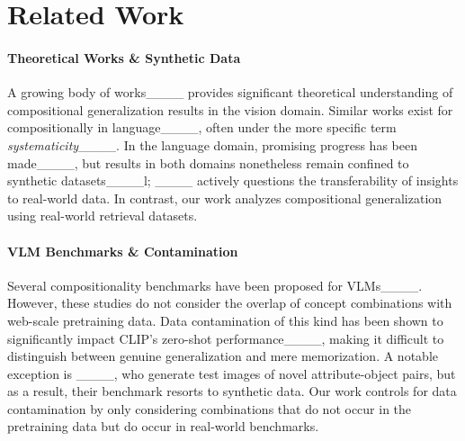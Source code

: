 \section{Related Work}
\label{sec:related}

\paragraph{Theoretical Works \& Synthetic Data}
A growing body of works____ provides significant theoretical understanding of compositional generalization results in the vision domain.
Similar works exist for compositionally in language____, often under the more specific term \emph{systematicity}____.
In the language domain, promising progress has been made____, but results in both domains nonetheless remain confined to synthetic datasets____l; ____ actively questions the transferability of insights to real-world data. In contrast, our work analyzes compositional generalization using real-world retrieval datasets.

\paragraph{VLM Benchmarks \& Contamination}
Several compositionality benchmarks have been proposed for VLMs____. However, these studies do not consider the overlap of concept combinations with web-scale pretraining data.
Data contamination of this kind has been shown to significantly impact CLIP's zero-shot performance____, making it difficult to distinguish between genuine generalization and mere memorization.
A notable exception is ____, who generate test images of novel attribute-object pairs, but as a result, their benchmark resorts to synthetic data. Our work controls for data contamination by only considering combinations that do not occur in the pretraining data but do occur in real-world benchmarks.